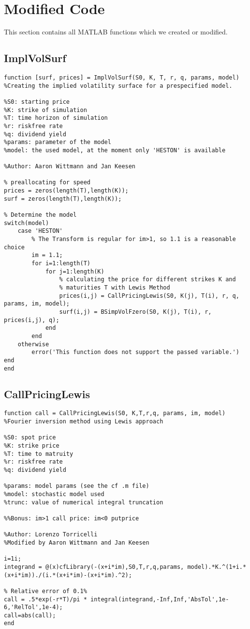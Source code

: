 \section{Modified Code}
This section contains all MATLAB functions which we created or modified.

\subsection*{ImplVolSurf}
    \begin{verbatim}
function [surf, prices] = ImplVolSurf(S0, K, T, r, q, params, model)
%Creating the implied volatility surface for a prespecified model.

%S0: starting price
%K: strike of simulation
%T: time horizon of simulation
%r: riskfree rate
%q: dividend yield
%params: parameter of the model
%model: the used model, at the moment only 'HESTON' is available

%Author: Aaron Wittmann and Jan Keesen

% preallocating for speed
prices = zeros(length(T),length(K));
surf = zeros(length(T),length(K));

% Determine the model
switch(model)
    case 'HESTON'
        % The Transform is regular for im>1, so 1.1 is a reasonable choice
        im = 1.1;
        for i=1:length(T)
            for j=1:length(K)
                % calculating the price for different strikes K and
                % maturities T with Lewis Method
                prices(i,j) = CallPricingLewis(S0, K(j), T(i), r, q, params, im, model);
                surf(i,j) = BSimpVolFzero(S0, K(j), T(i), r, prices(i,j), q);
            end
        end
    otherwise
        error('This function does not support the passed variable.')
end
end
\end{verbatim}

\subsection*{CallPricingLewis}

    \begin{verbatim}
function call = CallPricingLewis(S0, K,T,r,q, params, im, model)
%Fourier inversion method using Lewis approach

%S0: spot price
%K: strike price
%T: time to matruity
%r: riskfree rate
%q: dividend yield

%params: model params (see the cf .m file)
%model: stochastic model used
%trunc: value of numerical integral truncation

%%Bonus: im>1 call price: im<0 putprice

%Author: Lorenzo Torricelli
%Modified by Aaron Wittmann and Jan Keesen

i=1i;
integrand = @(x)cfLibrary(-(x+i*im),S0,T,r,q,params, model).*K.^(1+i.*(x+i*im))./(i.*(x+i*im)-(x+i*im).^2);

% Relative error of 0.1%
call = .5*exp(-r*T)/pi * integral(integrand,-Inf,Inf,'AbsTol',1e-6,'RelTol',1e-4);
call=abs(call);
end
\end{verbatim}

